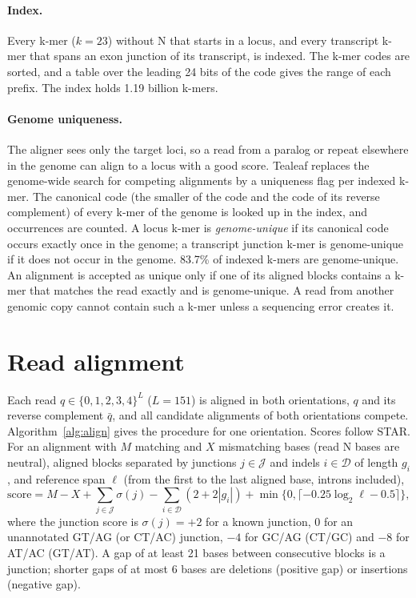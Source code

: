 \documentclass[11pt]{article}
\begin{document}
\paragraph{Index.} Every k-mer ($k=23$) without N that starts in a locus, and every transcript k-mer that spans an exon junction of its transcript, is indexed. The k-mer codes are sorted, and a table over the leading 24 bits of the code gives the range of each prefix. The index holds 1.19 billion k-mers.

\paragraph{Genome uniqueness.} The aligner sees only the target loci, so a read from a paralog or repeat elsewhere in the genome can align to a locus with a good score. Tealeaf replaces the genome-wide search for competing alignments by a uniqueness flag per indexed k-mer. The canonical code (the smaller of the code and the code of its reverse complement) of every k-mer of the genome is looked up in the index, and occurrences are counted. A locus k-mer is \emph{genome-unique} if its canonical code occurs exactly once in the genome; a transcript junction k-mer is genome-unique if it does not occur in the genome. 83.7\% of indexed k-mers are genome-unique. An alignment is accepted as unique only if one of its aligned blocks contains a k-mer that matches the read exactly and is genome-unique. A read from another genomic copy cannot contain such a k-mer unless a sequencing error creates it.

\section{Read alignment}

Each read $q\in\{0,1,2,3,4\}^L$ ($L=151$) is aligned in both orientations, $q$ and its reverse complement $\bar q$, and all candidate alignments of both orientations compete. Algorithm~\ref{alg:align} gives the procedure for one orientation. Scores follow STAR. For an alignment with $M$ matching and $X$ mismatching bases (read N bases are neutral), aligned blocks separated by junctions $j\in\mathcal J$ and indels $i\in\mathcal D$ of length $g_i$, and reference span $\ell$ (from the first to the last aligned base, introns included), \[\mathrm{score}=M-X+\sum_{j\in\mathcal J}\sigma(j)-\sum_{i\in\mathcal D}(2+2|g_i|)+\min\{0,\lceil-0.25\log_2\ell-0.5\rceil\},\] where the junction score is $\sigma(j)=+2$ for a known junction, $0$ for an unannotated GT/AG (or CT/AC) junction, $-4$ for GC/AG (CT/GC) and $-8$ for AT/AC (GT/AT). A gap of at least 21 bases between consecutive blocks is a junction; shorter gaps of at most 6 bases are deletions (positive gap) or insertions (negative gap).
\end{document}
